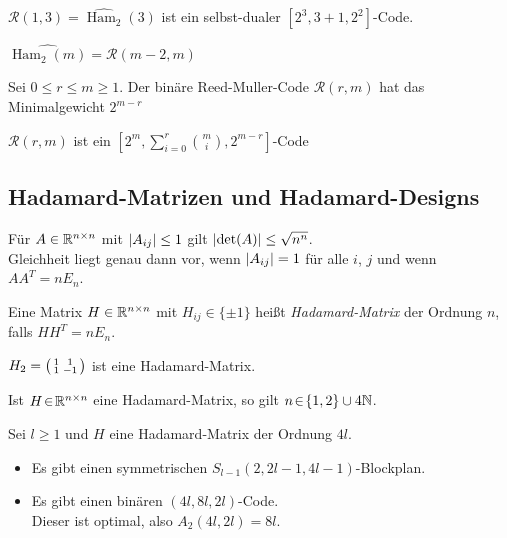 \documentclass{cheat-sheet}
\DeclareMathOperator{\Ham}{Ham} %
\newcommand{\RM}{\mathcal{R}} %
\newcommand{\PCE}[1]{\widehat{#1}} %
\begin{document}
\begin{bsp}
  $\RM(1, 3) = \PCE{\Ham_2}(3)$ ist ein selbst-dualer $[2^3, 3 + 1, 2^2]$-Code.
\end{bsp}

\begin{lem}
  $\PCE{\Ham_2(m)} = \RM(m-2, m)$
\end{lem}

\begin{satz}
  Sei $0 \leq r \leq m \geq 1$. Der binäre Reed-Muller-Code $\RM(r, m)$ hat das Minimalgewicht $2^{m-r}$
\end{satz}

\begin{kor}
   $\RM(r, m)$ ist ein $[2^m, \sum_{i=0}^r \binom{m}{i}, 2^{m-r}]$-Code
\end{kor}

\subsection{Hadamard-Matrizen und Hadamard-Designs}

\begin{satz}
  Für $A \in \mathbb{R}^{n \times n}$ mit $\lvert A_{ij}\rvert \leq 1$ gilt $\lvert\det(A)\rvert \leq \sqrt{n^n}$. \\
  Gleichheit liegt genau dann vor, wenn $\lvert A_{ij}\rvert = 1$ für alle $i$, $j$ und wenn $A A^T = n E_n$.
\end{satz}

\begin{defn}
  Eine Matrix $H \in \mathbb{R}^{n \times n}$ mit $H_{ij} \in \{ \pm 1 \}$ heißt \emph{Hadamard-Matrix} der Ordnung $n$, falls $H H^T = n E_n$.
\end{defn}

\begin{bsp}
  $H_2 = \begin{psmallmatrix}
    1 & 1 \\
    1 & -1
  \end{psmallmatrix}$
  ist eine Hadamard-Matrix.
\end{bsp}

\begin{satz}
  Ist $H \!\in\! \mathbb{R}^{n \times n}$ eine Hadamard-Matrix, so gilt $n \!\in\! \{ 1, 2 \} \cup 4 \mathbb{N}$.
\end{satz}

\begin{satz}
  Sei $l \geq 1$ und $H$ eine Hadamard-Matrix der Ordnung $4 l$.
  \begin{itemize}
    \item Es gibt einen symmetrischen $S_{l-1}(2, 2l - 1, 4l - 1)$-Blockplan.
    \item Es gibt einen binären $(4l, 8l, 2l)$-Code. \\
    Dieser ist optimal, also $A_2(4l, 2l) = 8l$.
  \end{itemize}
\end{satz}
\end{document}
